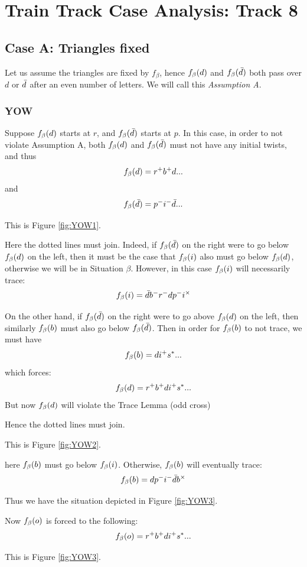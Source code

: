 \chapter[Train Track Case Analysis: Track 8]{Train Track Case Analysis: Track 8}
\label{app:case_analysis_track8}

\section{Case A: Triangles fixed} \label{CaseATrack8}

Let us assume the triangles are fixed by $f_\beta$, hence $f_\beta(d)$ and $f_\beta(\bar{d})$ both pass over $d$ or $\bar{d}$ after an even
number of letters. We will call this \emph{Assumption A}. 

\subsection{YOW}\label{YOW}
Suppose $f_\beta(d)$ starts at $r$, and $f_\beta(\bar{d})$ starts at $p$. In this case, in order to not violate Assumption A, both $f_\beta(d)$ and $f_\beta(\bar{d})$ must not have any initial twists, and thus
\[
f_\beta(d) = r^+ b^+ d...
\]
and 
\[
f_\beta(\bar{d}) = p^- i^- \bar{d}...
\]

This is Figure \ref{fig:YOW1}.

Here the dotted lines must join. Indeed, if $f_\beta(\bar{d})$ on the right were to go below $f_\beta(d)$ on the left, then it must be the case that $f_\beta(i)$ also must go below $f_\beta(d)$, otherwise we will be in Situation $\beta$. However, in this case $f_\beta(i)$ will necessarily trace:
\[
f_\beta(i) = \bar{d} b^- r^- d p^- i^\times
\]

On the other hand, if $f_\beta(\bar{d})$ on the right were to go above $f_\beta(d)$ on the left, then similarly $f_\beta(b)$ must also go below $f_\beta(\bar{d})$. Then in order for $f_\beta(b)$ to not trace, we must have
\[
f_\beta(b) = d i^+ s^*...
\]
which forces:
\[
f_\beta(d) = r^+ b^+ d i^+ s^*...
\]
But now $f_\beta(d)$ will violate the Trace Lemma (odd cross)

Hence the dotted lines must join.

This is Figure \ref{fig:YOW2}.

here $f_\beta(b)$ must go below $f_\beta(i)$. Otherwise, $f_\beta(b)$ will eventually trace:
\[
f_\beta(b) = d p^- i^- \bar{d} b^\times
\]

Thus we have the situation depicted in Figure \ref{fig:YOW3}.

Now $f_\beta(o)$ is forced to the following:
\[
f_\beta(o) = r^+ b^+ d i^+ s^*...
\]

This is Figure \ref{fig:YOW3}.

